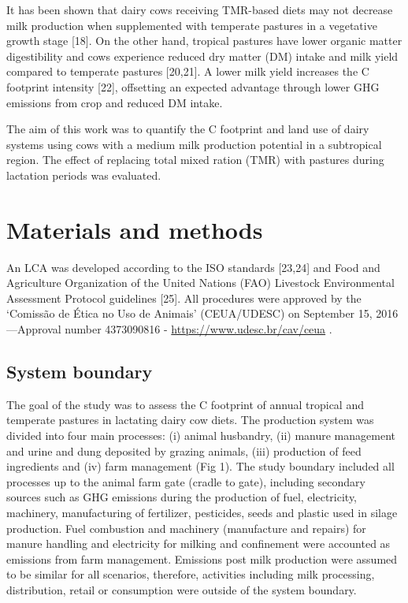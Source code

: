 \documentclass[11pt,a4paper]{article}
\begin{document}
It has been shown that dairy cows receiving TMR-based diets may not decrease milk production when supplemented with temperate pastures in a vegetative growth stage [18]. On the other hand, tropical pastures have lower organic matter digestibility and cows experience reduced dry matter (DM) intake and milk yield compared to temperate pastures [20,21]. A lower milk yield increases the C footprint intensity [22], offsetting an expected advantage through lower GHG emissions from crop and reduced DM intake.

The aim of this work was to quantify the C footprint and land use of dairy systems using cows with a medium milk production potential in a subtropical region. The effect of replacing total mixed ration (TMR) with pastures during lactation periods was evaluated.

\section{Materials and methods}

An LCA was developed according to the ISO standards [23,24] and Food and Agriculture Organization of the United Nations (FAO) Livestock Environmental Assessment Protocol guidelines [25]. All procedures were approved by the ‘Comissão de Ética no Uso de Animais’ (CEUA/UDESC) on September 15, 2016—Approval number 4373090816 - \href{https://www.udesc.br/cav/ceua}{https://www.udesc.br/cav/ceua} .

\subsection{System boundary}

The goal of the study was to assess the C footprint of annual tropical and temperate pastures in lactating dairy cow diets. The production system was divided into four main processes: (i) animal husbandry, (ii) manure management and urine and dung deposited by grazing animals, (iii) production of feed ingredients and (iv) farm management (Fig 1). The study boundary included all processes up to the animal farm gate (cradle to gate), including secondary sources such as GHG emissions during the production of fuel, electricity, machinery, manufacturing of fertilizer, pesticides, seeds and plastic used in silage production. Fuel combustion and machinery (manufacture and repairs) for manure handling and electricity for milking and confinement were accounted as emissions from farm management. Emissions post milk production were assumed to be similar for all scenarios, therefore, activities including milk processing, distribution, retail or consumption were outside of the system boundary.
\end{document}
